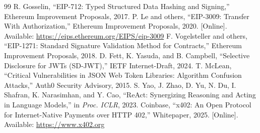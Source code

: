 \documentclass[10pt,twocolumn,letterpaper]{article}
\begin{document}
\begin{thebibliography}{99}
 R. Gosselin, ``EIP-712: Typed Structured Data Hashing and Signing,'' Ethereum Improvement Proposals, 2017.
 P. Le and others, ``EIP-3009: Transfer With Authorization,'' Ethereum Improvement Proposals, 2020. [Online]. Available: \url{https://eips.ethereum.org/EIPS/eip-3009}
 F. Vogelsteller and others, ``EIP-1271: Standard Signature Validation Method for Contracts,'' Ethereum Improvement Proposals, 2018.
 D. Fett, K. Yasuda, and B. Campbell, ``Selective Disclosure for JWTs (SD-JWT),'' IETF Internet-Draft, 2024.
 T. McLean, ``Critical Vulnerabilities in JSON Web Token Libraries: Algorithm Confusion Attacks,'' Auth0 Security Advisory, 2015.
 S. Yao, J. Zhao, D. Yu, N. Du, I. Shafran, K. Narasimhan, and Y. Cao, ``ReAct: Synergizing Reasoning and Acting in Language Models,'' in \textit{Proc. ICLR}, 2023.
 Coinbase, ``x402: An Open Protocol for Internet-Native Payments over HTTP 402,'' Whitepaper, 2025. [Online]. Available: \url{https://www.x402.org}
\end{thebibliography}
\end{document}
